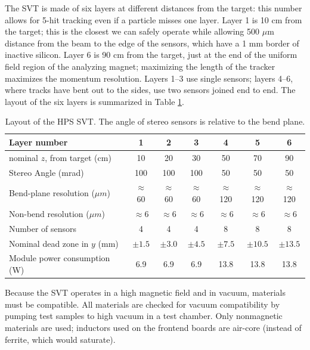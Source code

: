 The SVT is made of six layers at different distances from the target: this number allows for 5-hit tracking even if a particle misses one layer.
Layer 1 is 10 cm from the target; this is the closest we can safely operate while allowing 500 $\mu$m distance from the beam to the edge of the sensors, which have a 1 mm border of inactive silicon.
Layer 6 is 90 cm from the target, just at the end of the uniform field region of the analyzing magnet; maximizing the length of the tracker maximizes the momentum resolution.
Layers 1--3 use single sensors; layers 4--6, where tracks have bent out to the sides, use two sensors joined end to end.
The layout of the six layers is summarized in Table \ref{tab:svt_layout}.

\begin{table}[ht]
    \begin{center}
        \caption{Layout of the HPS SVT.  The angle of stereo sensors is relative to the bend plane.}
        \begin{tabular}{lcccccc}   
            \hline \hline 
            Layer number & 1 & 2 & 3 & 4 & 5 & 6 \\      
            \hline
            nominal $z$, from target (cm)  & 10 & 20 & 30 & 50 & 70  & 90 \\ 
            Stereo Angle (mrad)  & 100 & 100 & 100 & 50 & 50 & 50 \\ 
            Bend-plane resolution ($\mu m$)  & $\approx$60 & $\approx$60 & $\approx$60 & $\approx$120 & $\approx$120 & $\approx$120 \\ 
            Non-bend resolution ($\mu m$)  & $\approx$6 & $\approx$6 & $\approx$6 & $\approx$6 & $\approx$6  & $\approx$6 \\ 
            Number of sensors  & 4 & 4 & 4 & 8 & 8 & 8 \\ 
            Nominal dead zone in $y$ (mm)  & $\pm1.5$  & $\pm3.0$  & $\pm4.5$  & $\pm7.5$  & $\pm10.5$ & $\pm13.5$  \\ 
            Module power consumption (W) & 6.9 & 6.9 & 6.9 & 13.8 & 13.8 & 13.8 \\
            \hline \hline
        \end{tabular}
        \label{tab:svt_layout} 
    \end{center}
\end{table}

Because the SVT operates in a high magnetic field and in vacuum, materials must be compatible.
All materials are checked for vacuum compatibility by pumping test samples to high vacuum in a test chamber.
Only nonmagnetic materials are used; inductors used on the frontend boards are air-core (instead of ferrite, which would saturate).


